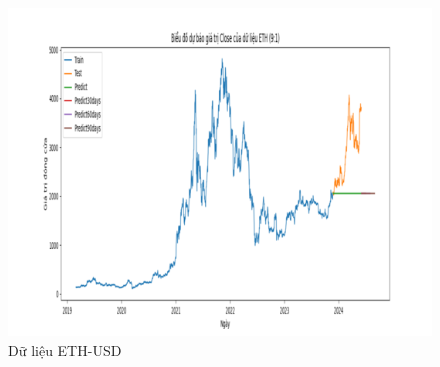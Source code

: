 \documentclass[conference]{IEEEtran}
\begin{document}
\begin{figure}[H]
\begin{minipage}{0.15\textwidth}
    \includegraphics[width=1\textwidth]{Figure/ARIMA_ETH_91.png}
    \end{minipage}
    \caption{Dữ liệu ETH-USD}
    \label{fig:1}
\end{figure}
\end{document}
